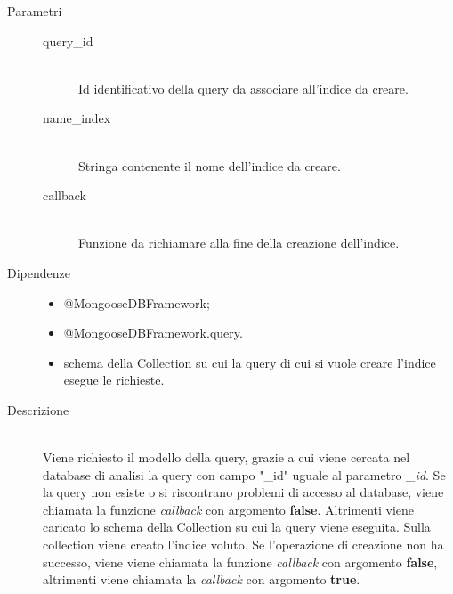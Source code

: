 \begin{description}
\begin{mldescription}
    \begin{description}
	 \item[Parametri]
	  \begin{description}
	   \item[query\_id] \hfill \\
	   Id identificativo della query da associare all'indice da creare.
	   \item[name\_index] \hfill \\
	   Stringa contenente il nome dell'indice da creare.
	   \item[callback] \hfill \\
	   Funzione da richiamare alla fine della creazione dell'indice.
	  \end{description}
	 \item[Dipendenze] \hfill
	  \begin{itemize}
	   \item @MongooseDBFramework;	   
	   \item @MongooseDBFramework.query.
	   \item schema della Collection su cui la query di cui si vuole creare l'indice esegue le richieste.
	  \end{itemize}
	 \item[Descrizione] \hfill \\
	 Viene richiesto il modello della query, grazie a cui viene cercata nel database di analisi la query con campo "\_id" uguale al parametro \textit{\_id}. Se la query non esiste o si riscontrano problemi di accesso al database, viene chiamata la funzione \textit{callback} con argomento \textbf{false}. Altrimenti viene caricato lo schema della Collection su cui la query viene eseguita. Sulla collection viene creato l'indice voluto. Se l'operazione di creazione non ha successo, viene viene chiamata la funzione \textit{callback} con argomento \textbf{false}, altrimenti viene chiamata la \textit{callback} con argomento \textbf{true}.
	 
	\end{description}	    
    
  \end{mldescription}
\end{description}

